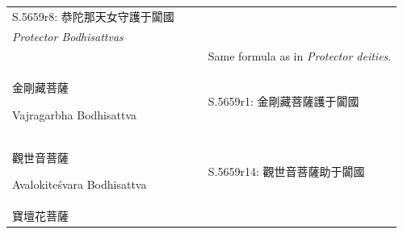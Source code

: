\documentclass[
  english,
  a4paper,
  DIV=12,
  footlines=2.1,
  usegeometry=true]{scrartcl}
\begin{document}
\begin{longtable}[]{@{}llll@{}}
\begin{minipage}[t]{0.44\columnwidth}
S.5659r8: 恭陀那天女守護于闐國\strut
\end{minipage}\tabularnewline
\begin{minipage}[t]{0.18\columnwidth}\raggedright
\emph{Protector Bodhisattvas}\strut
\end{minipage} & \begin{minipage}[t]{0.13\columnwidth}\raggedright
\strut
\end{minipage} & \begin{minipage}[t]{0.13\columnwidth}\raggedright
\strut
\end{minipage} & \begin{minipage}[t]{0.44\columnwidth}\raggedright
\strut
\end{minipage}\tabularnewline
\begin{minipage}[t]{0.18\columnwidth}\raggedright
\strut
\end{minipage} & \begin{minipage}[t]{0.13\columnwidth}\raggedright
\strut
\end{minipage} & \begin{minipage}[t]{0.13\columnwidth}\raggedright
\strut
\end{minipage} & \begin{minipage}[t]{0.44\columnwidth}\raggedright
Same formula as in \emph{Protector deities}.\strut
\end{minipage}\tabularnewline
\begin{minipage}[t]{0.18\columnwidth}\raggedright
金剛藏菩薩

Vajragarbha Bodhisattva\strut
\end{minipage} & \begin{minipage}[t]{0.13\columnwidth}\raggedright
\strut
\end{minipage} & \begin{minipage}[t]{0.13\columnwidth}\raggedright
\strut
\end{minipage} & \begin{minipage}[t]{0.44\columnwidth}\raggedright
S.5659r1: 金剛藏菩薩護于闐國\strut
\end{minipage}\tabularnewline
\begin{minipage}[t]{0.18\columnwidth}\raggedright
觀世音菩薩

Avalokiteśvara Bodhisattva\strut
\end{minipage} & \begin{minipage}[t]{0.13\columnwidth}\raggedright
\strut
\end{minipage} & \begin{minipage}[t]{0.13\columnwidth}\raggedright
\strut
\end{minipage} & \begin{minipage}[t]{0.44\columnwidth}\raggedright
S.5659r14: 觀世音菩薩助于闐國\strut
\end{minipage}\tabularnewline
\begin{minipage}[t]{0.18\columnwidth}\raggedright
寶壇花菩薩


\end{minipage}
\end{longtable}
\end{document}
